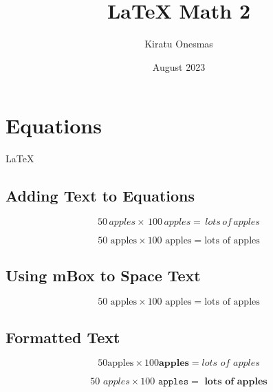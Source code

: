 \documentclass{article}
\title{LaTeX Math 2}
\author{Kiratu Onesmas}
\date{August 2023}
\begin{document}
\maketitle

\section{Equations}
\LaTeX\vspace{10pt}


\subsection{Adding Text to Equations}

\begin{equation}
50 \, apples \times \, 100 \, apples = \, lots \, of \, apples
\end{equation}
\vspace{10pt}


\begin{equation*}
50 \text{ apples} \times 100 \text{ apples} = \text{lots of apples}
\end{equation*}
\vspace{10pt}

\subsection{Using mBox to Space Text}
\begin{equation}
50 \mbox{ apples} \times 100 \mbox{ apples} =
\mbox{lots of apples}
\end{equation}

\subsection{Formatted Text}

\begin{equation}
50 \textrm{apples} \times 100 \textbf{apples} =
\textit{lots of apples}
\end{equation}
\vspace{10pt}

\begin{equation}
50 \textit{ apples} \times 100 \texttt{ apples} =
\textbf{ lots of apples}
\end{equation}
\vspace{10pt}
\end{document}
